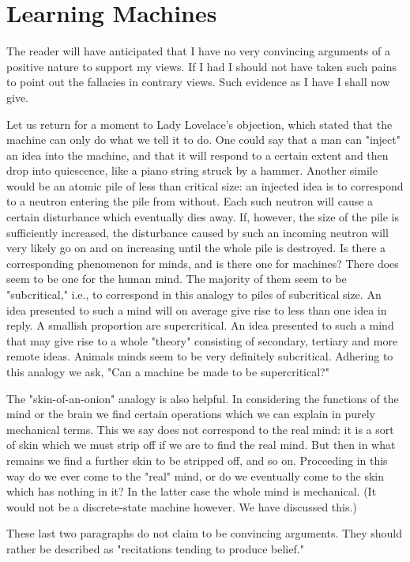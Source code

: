 \documentclass{article}
\begin{document}
\section{Learning Machines}

The reader will have anticipated that I have no very convincing arguments of a positive nature to support my views. If I had I should not have taken such pains to point out the fallacies in contrary views. Such evidence as I have I shall now give.

Let us return for a moment to Lady Lovelace's objection, which stated that the machine can only do what we tell it to do. One could say that a man can "inject" an idea into the machine, and that it will respond to a certain extent and then drop into quiescence, like a piano string struck by a hammer. Another simile would be an atomic pile of less than critical size: an injected idea is to correspond to a neutron entering the pile from without. Each such neutron will cause a certain disturbance which eventually dies away. If, however, the size of the pile is sufficiently increased, the disturbance caused by such an incoming neutron will very likely go on and on increasing until the whole pile is destroyed. Is there a corresponding phenomenon for minds, and is there one for machines? There does seem to be one for the human mind. The majority of them seem to be "subcritical," i.e., to correspond in this analogy to piles of subcritical size. An idea presented to such a mind will on average give rise to less than one idea in reply. A smallish proportion are supercritical. An idea presented to such a mind that may give rise to a whole "theory" consisting of secondary, tertiary and more remote ideas. Animals minds seem to be very definitely subcritical. Adhering to this analogy we ask, "Can a machine be made to be supercritical?"

The "skin-of-an-onion" analogy is also helpful. In considering the functions of the mind or the brain we find certain operations which we can explain in purely mechanical terms. This we say does not correspond to the real mind: it is a sort of skin which we must strip off if we are to find the real mind. But then in what remains we find a further skin to be stripped off, and so on. Proceeding in this way do we ever come to the "real" mind, or do we eventually come to the skin which has nothing in it? In the latter case the whole mind is mechanical. (It would not be a discrete-state machine however. We have discussed this.)

These last two paragraphs do not claim to be convincing arguments. They should rather be described as "recitations tending to produce belief."
\end{document}
